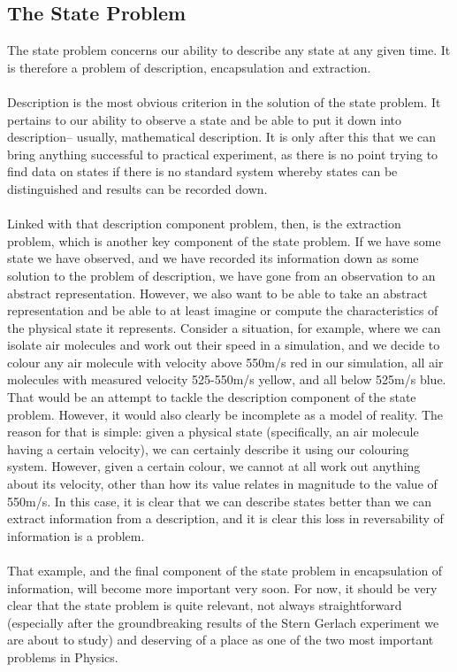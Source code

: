 \subsection*{The State Problem}
The state problem concerns our ability to describe any state at any given time. It is therefore a problem of description, encapsulation and extraction. 
\\\\
Description is the most obvious criterion in the solution of the state problem. It pertains to our ability to observe a state and be able to put it down into description-- usually, mathematical description. It is only after this that we can bring anything successful to practical experiment, as there is no point trying to find data on states if there is no standard system whereby states can be distinguished and results can be recorded down.
\\\\
Linked with that description component problem, then, is the extraction problem, which is another key component of the state problem. If we have some state we have observed, and we have recorded its information down as some solution to the problem of description, we have gone from an observation to an abstract representation. However, we also want to be able to take an abstract representation and be able to at least imagine or compute the characteristics of the physical state it represents. Consider a situation, for example, where we can isolate air molecules and work out their speed in a simulation, and we decide to colour any air molecule with velocity above 550m/s red in our simulation, all air molecules with measured velocity 525-550m/s yellow, and all below 525m/s blue. That would be an attempt to tackle the description component of the state problem. However, it would also clearly be incomplete as a model of reality. The reason for that is simple: given a physical state (specifically, an air molecule having a certain velocity), we can certainly describe it using our colouring system. However, given a certain colour, we cannot at all work out anything about its velocity, other than how its value relates in magnitude to the value of 550m/s. In this case, it is clear that we can describe states better than we can extract information from a description, and it is clear this loss in reversability of information is a problem. 
\\\\
That example, and the final component of the state problem in encapsulation of information, will become more important very soon. For now, it should be very clear that the state problem is quite relevant, not always straightforward (especially after the groundbreaking results of the Stern Gerlach experiment we are about to study) and deserving of a place as one of the two most important problems in Physics.
